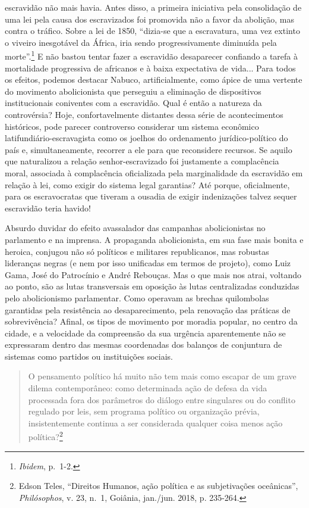escravidão não mais havia. Antes disso, a primeira iniciativa pela
consolidação de uma lei pela causa dos escravizados foi promovida não a
favor da abolição, mas contra o tráfico. Sobre a lei de 1850, ``dizia-se
que a escravatura, uma vez extinto o viveiro inesgotável da África, iria
sendo progressivamente diminuída pela morte''.\footnote{\emph{Ibidem},
  p.~1-2.} E não bastou tentar fazer a escravidão desaparecer confiando
a tarefa à mortalidade progressiva de africanos e à baixa expectativa de
vida... Para todos os efeitos, podemos destacar Nabuco, artificialmente,
como ápice de uma vertente do movimento abolicionista que perseguiu a
eliminação de dispositivos institucionais coniventes com a escravidão.
Qual é então a natureza da controvérsia? Hoje, confortavelmente
distantes dessa série de acontecimentos históricos, pode parecer
controverso considerar um sistema econômico latifundiário-escravagista
como os joelhos do ordenamento jurídico-político do país e,
simultaneamente, recorrer a ele para que reconsidere recursos. Se aquilo
que naturalizou a relação senhor-escravizado foi justamente a
complacência moral, associada à complacência oficializada pela
marginalidade da escravidão em relação à lei, como exigir do sistema
legal garantias? Até porque, oficialmente, para os escravocratas que
tiveram a ousadia de exigir indenizações talvez sequer escravidão teria
havido!

Absurdo duvidar do efeito avassalador das campanhas abolicionistas no
parlamento e na imprensa. A propaganda abolicionista, em sua fase mais
bonita e heroica, conjugou não só políticos e militares republicanos,
mas robustas lideranças negras (e nem por isso unificadas em termos de
projeto), como Luiz Gama, José do Patrocínio e André Rebouças. Mas o que
mais nos atrai, voltando ao ponto, são as lutas transversais em oposição
às lutas centralizadas conduzidas pelo abolicionismo parlamentar. Como
operavam as brechas quilombolas garantidas pela resistência ao
desaparecimento, pela renovação das práticas de sobrevivência? Afinal,
os tipos de movimento por moradia popular, no centro da cidade, e a
velocidade da compreensão da sua urgência aparentemente não se
expressaram dentro das mesmas coordenadas dos balanços de conjuntura de
sistemas como partidos ou instituições sociais.

\begin{quote}
O pensamento político há muito não tem mais como escapar de um grave
dilema contemporâneo: como determinada ação de defesa da vida processada
fora dos parâmetros do diálogo entre singulares ou do conflito regulado
por leis, sem programa político ou organização prévia, insistentemente
continua a ser considerada qualquer coisa menos ação política?\footnote{Edson
  Teles, ``Direitos Humanos, ação política e as subjetivações
  oceânicas'', \emph{Philósophos}, v. 23, n.~1, Goiânia, jan./jun. 2018,
  p. 235-264.}
\end{quote}


